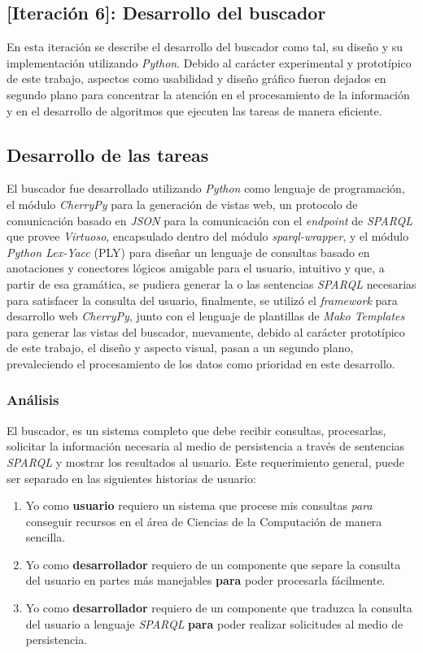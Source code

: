 \begin{itemize}
\section{[Iteración 6]: Desarrollo del buscador}
En esta iteración se describe el desarrollo del buscador como tal, su diseño y su implementación utilizando \textit{Python}. Debido al carácter experimental y prototípico de este trabajo, aspectos como usabilidad y diseño gráfico fueron dejados en segundo plano para concentrar la atención en el procesamiento de la información y en el desarrollo de algoritmos que ejecuten las tareas de manera eficiente.

\subsection{Desarrollo de las tareas}
El buscador fue desarrollado utilizando \textit{Python} como lenguaje de programación, el módulo \textit{CherryPy} para la generación de vistas web, un protocolo de comunicación basado en \textit{JSON} para la comunicación con el \textit{endpoint} de \textit{SPARQL} que provee \textit{Virtuoso}, encapsulado dentro del módulo \textit{sparql-wrapper}, y el módulo \textit{Python Lex-Yacc} (PLY) para diseñar un lenguaje de consultas basado en anotaciones y conectores lógicos amigable para el usuario, intuitivo y que, a partir de esa gramática, se pudiera generar la o las sentencias \textit{SPARQL} necesarias para satisfacer la consulta del usuario, finalmente, se utilizó el \textit{framework} para desarrollo web \textit{CherryPy}, junto con el lenguaje de plantillas de \textit{Mako Templates} para generar las vistas del buscador, nuevamente, debido al carácter prototípico de este trabajo, el diseño y aspecto visual, pasan a un segundo plano, prevaleciendo el procesamiento de los datos como prioridad en este desarrollo.

\subsubsection{Análisis}
El buscador, es un sistema completo que debe recibir consultas, procesarlas, solicitar la información necesaria al medio de persistencia a través de sentencias \textit{SPARQL} y mostrar los resultados al usuario. Este requerimiento general, puede ser separado en las siguientes historias de usuario:

\begin{enumerate}
    \item Yo como \textbf{usuario} requiero un sistema que procese mis consultas \textit{para} conseguir recursos en el área de Ciencias de la Computación de manera sencilla.
    \item Yo como \textbf{desarrollador} requiero de un componente que separe la consulta del usuario en partes más manejables \textbf{para} poder procesarla fácilmente.
    \item Yo como \textbf{desarrollador} requiero de un componente que traduzca la consulta del usuario a lenguaje \textit{SPARQL} \textbf{para} poder realizar solicitudes al medio de persistencia.
\end{enumerate}


\end{itemize}
